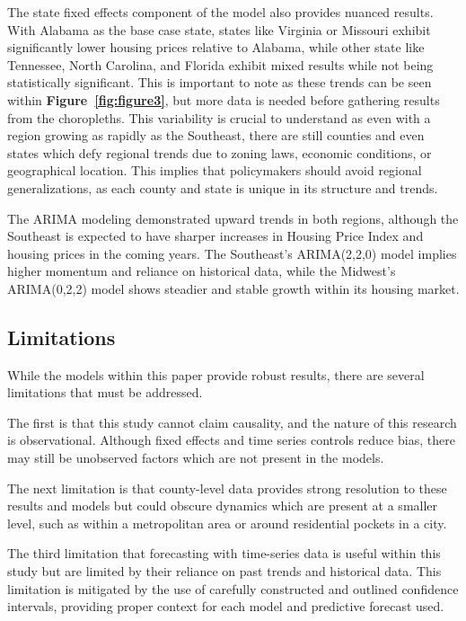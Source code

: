 \documentclass[journal,article,submit,pdftex,moreauthors]{Definitions/mdpi}
\begin{document}
The state fixed effects component of the model also provides nuanced results. With Alabama as the base case state, states like Virginia or Missouri exhibit significantly lower housing prices relative to Alabama, while other state like Tennessee, North Carolina, and Florida exhibit mixed results while not being statistically significant. This is important to note as these trends can be seen within \textbf{Figure~\ref{fig:figure3}}, but more data is needed before gathering results from the choropleths. This variability is crucial to understand as even with a region growing as rapidly as the Southeast, there are still counties and even states which defy regional trends due to zoning laws, economic conditions, or geographical location. This implies that policymakers should avoid regional generalizations, as each county and state is unique in its structure and trends.
 
The ARIMA modeling demonstrated upward trends in both regions, although the Southeast is expected to have sharper increases in Housing Price Index and housing prices in the coming years. The Southeast’s ARIMA(2,2,0) model implies higher momentum and reliance on historical data, while the Midwest’s ARIMA(0,2,2) model shows steadier and stable growth within its housing market.


\subsection{Limitations}

While the models within this paper provide robust results, there are several limitations that must be addressed.
 
The first is that this study cannot claim causality, and the nature of this research is observational. Although fixed effects and time series controls reduce bias, there may still be unobserved factors which are not present in the models.
 
The next limitation is that county-level data provides strong resolution to these results and models but could obscure dynamics which are present at a smaller level, such as within a metropolitan area or around residential pockets in a city.
 
The third limitation that forecasting with time-series data is useful within this study but are limited by their reliance on past trends and historical data. This limitation is mitigated by the use of carefully constructed and outlined confidence intervals, providing proper context for each model and predictive forecast used.
\end{document}
